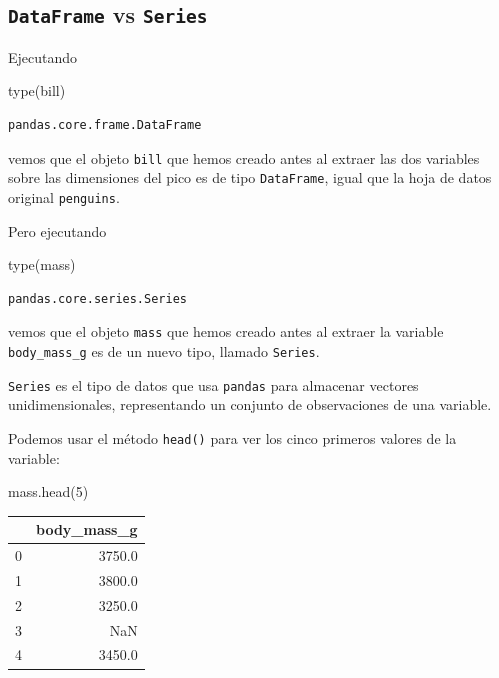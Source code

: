 \documentclass[
  a4paper,
  noprof,
  12pt,
  notoc,
  nosols,
  nobib]{mnye}
\newenvironment{Shaded}{\begin{snugshade}}{\end{snugshade}}
\newcommand{\BuiltInTok}[1]{\textcolor[rgb]{0.00,0.23,0.31}{#1}}
\newcommand{\DecValTok}[1]{\textcolor[rgb]{0.68,0.00,0.00}{#1}}
\newcommand{\NormalTok}[1]{\textcolor[rgb]{0.00,0.23,0.31}{#1}}
\theoremstyle{definition}
\theoremstyle{remark}
\begin{document}
\hypertarget{dataframe-vs-series}{%
\subsection{\texorpdfstring{\texttt{DataFrame} vs
\texttt{Series}}{DataFrame vs Series}}\label{dataframe-vs-series}}

Ejecutando

\begin{Shaded}
\begin{Highlighting}[]
\BuiltInTok{type}\NormalTok{(bill)}
\end{Highlighting}
\end{Shaded}

\begin{verbatim}
pandas.core.frame.DataFrame
\end{verbatim}

vemos que el objeto \texttt{bill} que hemos creado antes al extraer las
dos variables sobre las dimensiones del pico es de tipo
\texttt{DataFrame}, igual que la hoja de datos original
\texttt{penguins}.

Pero ejecutando

\begin{Shaded}
\begin{Highlighting}[]
\BuiltInTok{type}\NormalTok{(mass)}
\end{Highlighting}
\end{Shaded}

\begin{verbatim}
pandas.core.series.Series
\end{verbatim}

vemos que el objeto \texttt{mass} que hemos creado antes al extraer la
variable \texttt{body\_mass\_g} es de un nuevo tipo, llamado
\texttt{Series}.

\texttt{Series} es el tipo de datos que usa \texttt{pandas} para
almacenar vectores unidimensionales, representando un conjunto de
observaciones de una variable.

Podemos usar el método \texttt{head()} para ver los cinco primeros
valores de la variable:

\begin{Shaded}
\begin{Highlighting}[]
\NormalTok{mass.head(}\DecValTok{5}\NormalTok{)}
\end{Highlighting}
\end{Shaded}

\begin{tabular}{lr}
\toprule
{} &  body\_mass\_g \\
\midrule
0 &       3750.0 \\
1 &       3800.0 \\
2 &       3250.0 \\
3 &          NaN \\
4 &       3450.0 \\
\bottomrule
\end{tabular}
\end{document}
